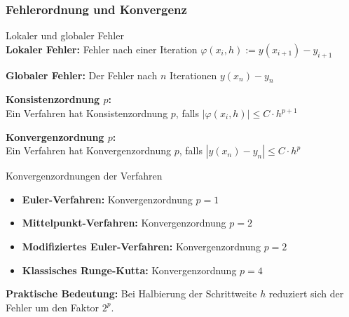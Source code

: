 \subsubsection{Fehlerordnung und Konvergenz}

\begin{definition}{Lokaler und globaler Fehler}\\
\textbf{Lokaler Fehler:} Fehler nach einer Iteration
$\varphi(x_i, h) := y(x_{i+1}) - y_{i+1}$

\textbf{Globaler Fehler:} Der Fehler nach $n$ Iterationen
$y(x_n) - y_n$

\textbf{Konsistenzordnung $p$:} \\ Ein Verfahren hat Konsistenzordnung $p$, falls
$|\varphi(x_i, h)| \leq C \cdot h^{p+1}$

\textbf{Konvergenzordnung $p$:} \\ Ein Verfahren hat Konvergenzordnung $p$, falls
$|y(x_n) - y_n| \leq C \cdot h^p$
\end{definition}

\begin{concept}{Konvergenzordnungen der Verfahren}
\begin{itemize}
    \item \textbf{Euler-Verfahren:} Konvergenzordnung $p = 1$
    \item \textbf{Mittelpunkt-Verfahren:} Konvergenzordnung $p = 2$
    \item \textbf{Modifiziertes Euler-Verfahren:} Konvergenzordnung $p = 2$
    \item \textbf{Klassisches Runge-Kutta:} Konvergenzordnung $p = 4$
\end{itemize}

\textbf{Praktische Bedeutung:} Bei Halbierung der Schrittweite $h$ reduziert sich der Fehler um den Faktor $2^p$.
\end{concept}

